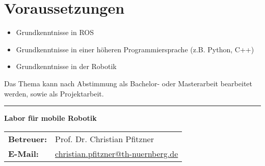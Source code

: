 \documentclass[a4paper,11pt]{article}
\begin{document}
\section*{Voraussetzungen}
\begin{itemize}[leftmargin=0.5cm]
    \item Grundkenntnisse in ROS 
    \item Grundkenntnisse in einer höheren Programmiersprache (z.B. Python, C++)
    \item Grundkenntnisse in der Robotik
\end{itemize}

\vspace{0.5cm}
Das Thema kann nach Abstimmung als Bachelor- oder Masterarbeit bearbeitet werden, sowie als Projektarbeit. 


\vfill
\textcolor{ohm_red}{\rule{\linewidth}{0.4mm}}
\textbf{\textcolor{ohm_red}{Labor für mobile Robotik}} \\
\begin{tabular}{@{}ll}
\textbf{Betreuer:} & Prof. Dr. Christian Pfitzner \\
\textbf{E-Mail:}   & \href{mailto:christian.pfitzner@th-nuernberg.de}{christian.pfitzner@th-nuernberg.de} \\
\end{tabular}
\end{document}
